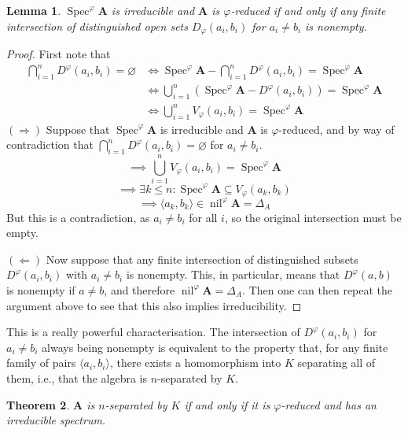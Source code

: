 \documentclass{article}
\theoremstyle{plain}
\newtheorem{theorem}{Theorem}[section]
\newtheorem{lemma}[theorem]{Lemma}
\theoremstyle{definition}
\newcommand{\Spec}{\operatorname{Spec}}
\newcommand{\nil}{\operatorname{nil}}
\begin{document}
\begin{lemma} \label{lem:irreduciblereducedequivcond}
    $\Spec^\varphi\mathbf{A}$ is irreducible and $\mathbf{A}$ is $\varphi$-reduced if and only if any finite intersection of distinguished open sets $D_\varphi(a_i, b_i)$ for $a_i\neq b_i$ is nonempty.
\end{lemma}
\begin{proof}
    First note that
    \begin{align*}
        \bigcap_{i=1}^n D^\varphi(a_i, b_i) = \varnothing &\iff \Spec^\varphi \mathbf{A} - \bigcap_{i=1}^n D^\varphi(a_i, b_i) = \Spec^\varphi\mathbf{A}\\
        &\iff \bigcup_{i=1}^n (\Spec^\varphi\mathbf{A} - D^\varphi(a_i, b_i)) = \Spec^\varphi\mathbf{A}\\
        &\iff \bigcup_{i=1}^n V_\varphi(a_i, b_i) = \Spec^\varphi\mathbf{A}
    \end{align*}
    $(\Rightarrow)$
    Suppose that $\Spec^\varphi\mathbf{A}$ is irreducible and $\mathbf{A}$ is $\varphi$-reduced, and by way of contradiction that $\bigcap_{i=1}^n D^\varphi(a_i, b_i) = \varnothing$ for $a_i\neq b_i$.
    $$\implies \bigcup_{i=1}^n V_\varphi(a_i, b_i) = \Spec^\varphi\mathbf{A}$$
    $$\implies \exists k \leq n : \Spec^\varphi\mathbf{A} \subseteq V_\varphi(a_k, b_k)$$
    $$\implies \langle a_k, b_k\rangle \in \nil^\varphi\mathbf{A} = \Delta_A$$
    But this is a contradiction, as $a_i \neq b_i$ for all $i$, so the original intersection must be empty.\par
    $(\Leftarrow)$
    Now suppose that any finite intersection of distinguished subsets $D^\varphi(a_i, b_i)$ with $a_i\neq b_i$ is nonempty.
    This, in particular, means that $D^\varphi(a, b)$ is nonempty if $a\neq b$, and therefore $\nil^\varphi\mathbf{A} = \Delta_A$.
    Then one can then repeat the argument above to see that this also implies irreducibility.
\end{proof}

This is a really powerful characterisation.
The intersection of $D^\varphi(a_i, b_i)$ for $a_i\neq b_i$ always being nonempty is equivalent to the property that, for any finite family of pairs $\langle a_i, b_i\rangle$, there exists a homomorphism into $K$ separating all of them, i.e., that the algebra is $n$-separated by $K$.

\begin{theorem}
    $\mathbf{A}$ is $n$-separated by $K$ if and only if it is $\varphi$-reduced and has an irreducible spectrum.
\end{theorem}
\end{document}
